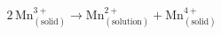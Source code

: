 \documentclass[preview]{standalone}
\begin{document}
\[2\,\text{Mn}^{3+}_{(\text{solid})} \longrightarrow \text{Mn}^{2+}_{(\text{solution})} + \text{Mn}^{4+}_{(\text{solid})} \tag{5.3}\]
\end{document}
